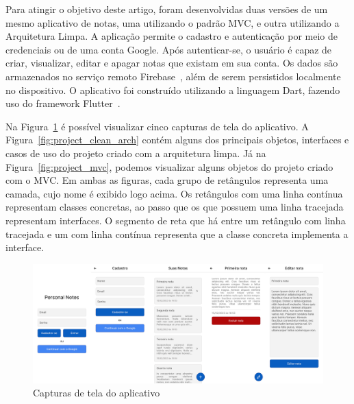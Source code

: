 Para atingir o objetivo deste artigo, foram desenvolvidas duas versões de um mesmo aplicativo de notas, uma utilizando o padrão MVC, e outra utilizando a Arquitetura Limpa.
A aplicação permite o cadastro e autenticação por meio de credenciais ou de uma conta Google.
Após autenticar-se, o usuário é capaz de criar, visualizar, editar e apagar notas que existam em sua conta.
Os dados são armazenados no serviço remoto Firebase~\cite{firebase}, além de serem persistidos localmente no dispositivo.
O aplicativo foi construído utilizando a linguagem Dart, fazendo uso do framework Flutter~\cite{flutter}.

Na Figura~\ref{fig:screenshots} é possível visualizar cinco capturas de tela do aplicativo.
A Figura~\ref{fig:project_clean_arch} contém alguns dos principais objetos, interfaces e casos de uso do projeto criado com a arquitetura limpa.
Já na Figura~\ref{fig:project_mvc}, podemos visualizar alguns objetos do projeto criado com o MVC\@.
Em ambas as figuras, cada grupo de retângulos representa uma camada, cujo nome é exibido logo acima.
Os retângulos com uma linha contínua representam classes concretas, ao passo que os que possuem uma linha tracejada representam interfaces.
O segmento de reta que há entre um retângulo com linha tracejada e um com linha contínua representa que a classe concreta implementa a interface.
\begin{figure}[ht]
	\centering
	\includegraphics[width=1\textwidth]{images/screenshots.png}
	\caption{Capturas de tela do aplicativo}
	\label{fig:screenshots}
\end{figure}

